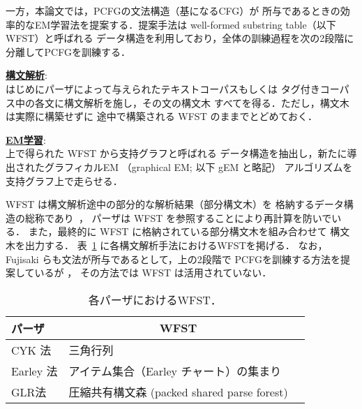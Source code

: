{一方，本論文では，PCFGの文法構造（基になるCFG）が
所与であるときの効率的なEM学習法を提案する．提案手法は
well-formed substring table（以下 WFST）と呼ばれる
データ構造を利用しており，全体の訓練過程を次の2段階に
分離してPCFGを訓練する．
\begin{description}
\item\underline{\bf 構文解析}:\\
	はじめにパーザによって与えられたテキストコーパスもしくは
	タグ付きコーパス中の各文に構文解析を施し，その文の構文木
	すべてを得る．ただし，構文木は実際に構築せずに
	途中で構築される WFST のままでとどめておく．
\item\underline{\bf EM学習}:\\
	上で得られた WFST から支持グラフと呼ばれる
	データ構造を抽出し，新たに導出されたグラフィカルEM
	（graphical EM; 以下 gEM と略記）
	アルゴリズムを支持グラフ上で走らせる．
\end{description}
WFST は構文解析途中の部分的な解析結果（部分構文木）を
格納するデータ構造の総称であり~\cite{Tanaka88,Nagata99}，
パーザは WFST を参照することにより再計算を防いでいる．
また，最終的に WFST に格納されている部分構文木を組み合わせて
構文木を出力する．
表~\ref{tab:WFST} に各構文解析手法におけるWFSTを掲げる．
なお，Fujisaki らも文法が所与であるとして，上の2段階で
PCFGを訓練する方法を提案しているが \cite{Fujisaki89}，
その方法では WFST は活用されていない．

\begin{table}[b]
\caption{各パーザにおけるWFST．}
\label{tab:WFST}
\begin{center}
\begin{tabular}{|l||l|l|}
\hline
パーザ&\multicolumn{1}{c|}{WFST}\\
\hline
CYK 法&三角行列\\
Earley 法&
	アイテム集合（Earley チャート）の集まり\\
GLR法&圧縮共有構文森 (packed shared parse forest)\\
\hline
\end{tabular}
\end{center}
\end{table}

}
